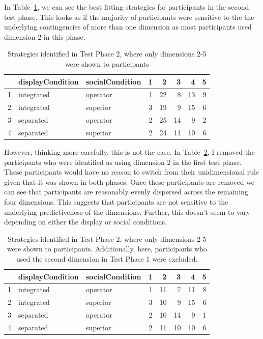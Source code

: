 \documentclass[doc, a4paper, apacite]{apa6}
\begin{document}
In Table~\ref{table:strategiesTest2}, we can see the best fitting strategies for participants in the second test phase. 
This looks as if the majority of participants were sensitive to the the underlying contingencies of more than one dimension as most participants used dimension 2 in this phase. 

\begin{table}[b]
	\centering
	\caption{Strategies identified in Test Phase 2, where only dimensions 2-5 were shown to participants}
	\label{table:strategiesTest2}
	\begin{tabular}{rllrrrrr}
	  \hline
	 & displayCondition & socialCondition & 1 & 2 & 3 & 4 & 5 \\ 
	  \hline
	1 & integrated & operator &   1 &  22 &   8 &  13 &   9 \\ 
	  2 & integrated & superior &   3 &  19 &   9 &  15 &   6 \\ 
	  3 & separated & operator &   2 &  25 &  14 &   9 &   2 \\ 
	  4 & separated & superior &   2 &  24 &  11 &  10 &   6 \\ 
	   \hline
	\end{tabular}
\end{table}

However, thinking more carefully, this is not the case. 
In Table~\ref{table:strategiesTest2withoutDim2}, I removed the participants who were identified as using dimension 2 in the first test phase. 
These participants would have no reason to switch from their unidimensional rule given that it was shown in both phases. 
Once these participants are removed we can see that participants are reasonably evenly dispersed across the remaining four dimensions. 
This suggests that participants are not sensitive to the underlying predictiveness of the dimensions. 
Further, this doesn't seem to vary depending on either the display or social conditions. 

\begin{table}
	\caption{Strategies identified in Test Phase 2, where only dimensions 2-5 were shown to participants. Additionally, here, participants who used the second dimension in Test Phase 1 were excluded.}
	\label{table:strategiesTest2withoutDim2}
	\centering
	\begin{tabular}{rllrrrrr}
	  \hline
	 & displayCondition & socialCondition & 1 & 2 & 3 & 4 & 5 \\ 
	  \hline
	  1 & integrated & operator &   1 &  11 &   7 &  11 &   8 \\ 
	  2 & integrated & superior &   3 &  10 &   9 &  15 &   6 \\ 
	  3 & separated & operator &   2 &  10 &  14 &   9 &   1 \\ 
	  4 & separated & superior &   2 &  11 &  10 &  10 &   6 \\ 
	   \hline
	\end{tabular}
\end{table}
\end{document}
